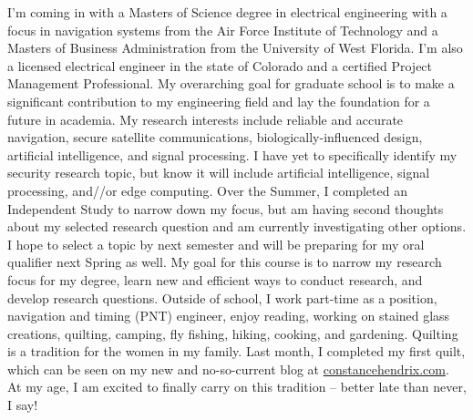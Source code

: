 \documentclass[12pt,conference]{IEEEtran}
\begin{document}
I’m coming in with a Masters of Science degree in electrical engineering with a focus in navigation systems from the Air Force Institute of Technology and a Masters of Business Administration from the University of West Florida.  I'm also a licensed electrical engineer in the state of Colorado and a certified Project Management Professional. My overarching goal for graduate school is to make a significant contribution to my engineering field and lay the foundation for a future in academia.  My research interests include reliable and accurate navigation, secure satellite communications, biologically-influenced design, artificial intelligence, and signal processing.  I have yet to specifically identify my security research topic, but know it will include artificial intelligence, signal processing, and//or edge computing. Over the Summer, I completed an Independent Study to narrow down my focus, but am having second thoughts about my selected research question and am currently investigating other options.  I hope to select a topic by next semester and will be preparing for my oral qualifier next Spring as well.  My goal for this course is to narrow my research focus for my degree, learn new and efficient ways to conduct research, and develop research questions. Outside of school, I work part-time as a position, navigation and timing (PNT) engineer, enjoy reading, working on stained glass creations, quilting, camping, fly fishing, hiking, cooking, and gardening.  Quilting is a tradition for the women in my family.  Last month, I completed my first quilt, which can be seen on my new and no-so-current blog at \url{constancehendrix.com}.  At my age, I am excited to finally carry on this tradition -- better late than never, I say!

\vspace{12pt}
\end{document}
